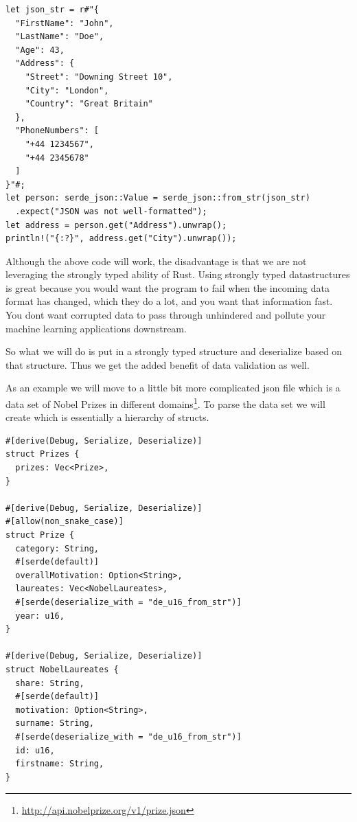 \documentclass{book}
\begin{document}
\begin{lstlisting}[caption={chapter4\\/working\_with\_data\\/data\_formats\\/src\\/jsonreading\\.rs},basicstyle=\small]
let json_str = r#"{
  "FirstName": "John",
  "LastName": "Doe",
  "Age": 43,
  "Address": {
    "Street": "Downing Street 10",
    "City": "London",
    "Country": "Great Britain"
  },
  "PhoneNumbers": [
    "+44 1234567",
    "+44 2345678"
  ]
}"#;
let person: serde_json::Value = serde_json::from_str(json_str)
  .expect("JSON was not well-formatted");
let address = person.get("Address").unwrap();
println!("{:?}", address.get("City").unwrap());
\end{lstlisting}

Although the above code will work, the disadvantage is that we are not leveraging the strongly typed ability of Rust. Using strongly typed datastructures is great because you would want the program to fail when the incoming data format has changed, which they do a lot, and you want that information fast. You dont want corrupted data to pass through unhindered and pollute your machine learning applications downstream.

So what we will do is put in a strongly typed structure and deserialize based on that structure. Thus we get the added benefit of data validation as well.

As an example we will move to a little bit more complicated json file which is a data set of Nobel Prizes in different domains\footnote{\href{Download prizes dataset}{http://api.nobelprize.org/v1/prize.json}}. To parse the data set we will create which is essentially a hierarchy of structs.

\begin{lstlisting}[caption={chapter4\\/working\_with\_data\\/data\_formats\\/src\\/jsonreading\\.rs},basicstyle=\small]
#[derive(Debug, Serialize, Deserialize)]
struct Prizes {
  prizes: Vec<Prize>,
}

#[derive(Debug, Serialize, Deserialize)]
#[allow(non_snake_case)]
struct Prize {
  category: String,
  #[serde(default)]
  overallMotivation: Option<String>,
  laureates: Vec<NobelLaureates>,
  #[serde(deserialize_with = "de_u16_from_str")]
  year: u16,
}

#[derive(Debug, Serialize, Deserialize)]
struct NobelLaureates {
  share: String,
  #[serde(default)]
  motivation: Option<String>,
  surname: String,
  #[serde(deserialize_with = "de_u16_from_str")]
  id: u16,
  firstname: String,
}
\end{lstlisting}
\end{document}
